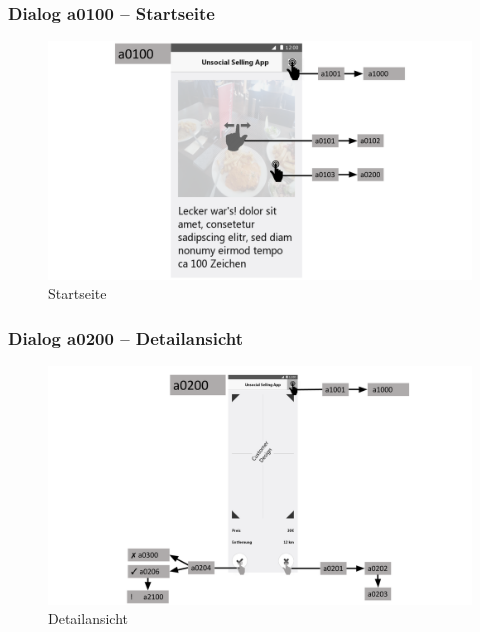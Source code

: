 \documentclass[a4paper,12pt,oneside]{scrartcl}
\begin{document}
\subsubsection{Dialog a0100 – Startseite}
\begin{figure}[!htbp]
\centering
\noindent\includegraphics[width=\linewidth,height=\textheight,keepaspectratio]{Dialoge/a0100}
\caption{Startseite}
\end{figure}
\FloatBarrier

\subsubsection{Dialog a0200 – Detailansicht}
\begin{figure}[!htbp]
\centering
\noindent\includegraphics[width=\linewidth,height=\textheight,keepaspectratio]{Dialoge/a0200}
\caption{Detailansicht}
\end{figure}
\FloatBarrier
\end{document}
